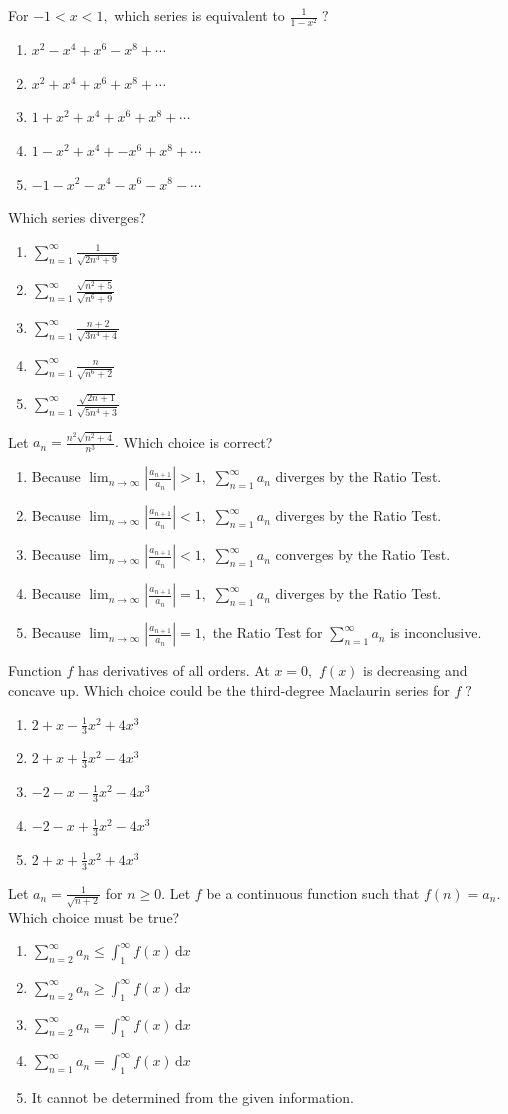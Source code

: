 \documentclass[letterstyle,12pt]{extarticle}
\newcounter{qcounter}
\newcommand{\di}{\, \text{d}}
\newcommand{\choices}[5]{
\vspace{0.8em} 
\begin{enumerate}[label=(\Alph*)]
\setlength\itemsep{1em} 
\item
#1 
\item 
#2
\item
#3
\item
#4
\item
#5
\end{enumerate}
}
\newcommand{\ans}[1]{{\color{black} #1}}
\newenvironment{question}
    {\begin{minipage}{0.9 \textwidth}
        \item
    }
    { 
    \end{minipage} \vspace{4ex}
    }
\begin{document}
\begin{list}{\textbf{.}~}{}
\begin{question}
For \(-1 < x < 1,\) which series is equivalent to \(\frac{1}{1 - x^2} \; ?\)
\choices
{\(x^2 - x^4 + x^6 - x^8 + \cdots\)}
{\(x^2 + x^4 + x^6 + x^8 + \cdots\)}
{\ans{\(1 + x^2 + x^4 + x^6 + x^8 + \cdots\)}}
{\(1 - x^2 + x^4 + -x^6 + x^8 + \cdots\)}
{\(-1 - x^2 - x^4 - x^6 - x^8 - \cdots\)}
\end{question}

\begin{question}
Which series diverges?
\choices
{\(\sum_{n = 1}^\infty \frac{1}{\sqrt{2n^3 + 9}}\)}
{\(\sum_{n = 1}^\infty \frac{\sqrt{n^2 + 5}}{\sqrt{n^6 + 9}}\)}
{\ans{\(\sum_{n = 1}^\infty \frac{n + 2}{\sqrt{3n^4 + 4}}\)}}
{\(\sum_{n = 1}^\infty \frac{n}{\sqrt{n^6 + 2}}\)}
{\(\sum_{n = 1}^\infty \frac{\sqrt{2n + 1}}{\sqrt{5n^4 + 3}}\)}
\end{question}

\begin{question}
Let \(a_n = \frac{n^2 \sqrt{n^2 + 4}}{n^3}.\) Which choice is correct?
\choices
{Because \(\lim_{n \to \infty} \left|\frac{a_{n + 1}}{a_n}\right| > 1,\) \(\sum_{n = 1}^\infty a_n\) diverges by the Ratio Test.}
{Because \(\lim_{n \to \infty} \left|\frac{a_{n + 1}}{a_n}\right| < 1,\) \(\sum_{n = 1}^\infty a_n\) diverges by the Ratio Test.}
{Because \(\lim_{n \to \infty} \left|\frac{a_{n + 1}}{a_n}\right| < 1,\) \(\sum_{n = 1}^\infty a_n\) converges by the Ratio Test.}
{Because \(\lim_{n \to \infty} \left|\frac{a_{n + 1}}{a_n}\right| = 1,\) \(\sum_{n = 1}^\infty a_n\) diverges by the Ratio Test.}
{\ans{Because \(\lim_{n \to \infty} \left|\frac{a_{n + 1}}{a_n}\right| = 1,\) the Ratio Test for \(\sum_{n = 1}^\infty a_n\) is inconclusive.}}
\end{question}

\begin{question}
Function \(f\) has derivatives of all orders. At \(x = 0,\) \(f(x)\) is decreasing and concave up. Which choice could be the third-degree Maclaurin series for \(f \; ?\)
\choices
{\(2 + x - \frac{1}{3} x^2 + 4x^3\)}
{\(2 + x + \frac{1}{3} x^2 - 4x^3\)}
{\(-2 - x - \frac{1}{3} x^2 - 4x^3\)}
{\ans{\(-2 - x + \frac{1}{3} x^2 - 4x^3\)}}
{\(2 + x + \frac{1}{3} x^2 + 4x^3\)}
\end{question}

\begin{question}
Let \(a_n = \frac{1}{\sqrt{n + 2}}\) for \(n \geq 0.\) Let \(f\) be a continuous function such that \(f(n) = a_n.\) Which choice must be true?
\choices
{\ans{\(\sum_{n = 2}^{\infty} a_n \leqslant \int_1^\infty f(x) \di x\)}}
{\(\sum_{n = 2}^{\infty} a_n \geqslant \int_1^\infty f(x) \di x\)}
{\(\sum_{n = 2}^{\infty} a_n = \int_1^\infty f(x) \di x\)}
{\(\sum_{n = 1}^{\infty} a_n = \int_1^\infty f(x) \di x\)}
{It cannot be determined from the given information.}
\end{question}


\end{list}
\end{document}

